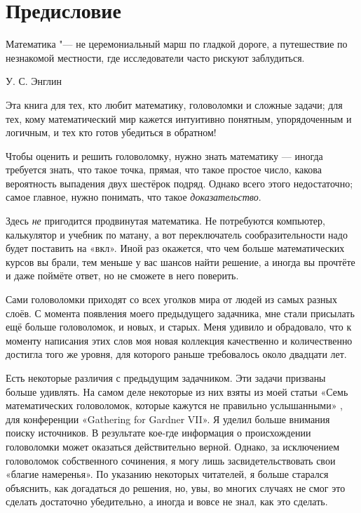 \chapter*{Предисловие}

\setlength{\epigraphwidth}{.6\textwidth}
\epigraph{Математика "--- не церемониальный марш по гладкой дороге, а путешествие по незнакомой местности, где исследователи часто рискуют заблудиться.
}{У. С. Энглин
}

Эта книга для тех, кто любит математику, головоломки и сложные задачи;
для тех, кому математический мир кажется интуитивно понятным, упорядоченным и логичным, и тех кто готов убедиться в обратном!

Чтобы оценить и решить головоломку, нужно знать математику --- 
иногда требуется знать, что такое точка, прямая, что такое простое число, какова вероятность выпадения двух шестёрок подряд.
Однако всего этого недостаточно; самое главное, нужно понимать, что такое \emph{доказательство}.

Здесь \emph{не} пригодится продвинутая математика.
Не потребуются компьютер, калькулятор и учебник по матану,
а вот переключатель сообразительности надо будет поставить на «вкл».
Иной раз окажется, что чем больше математических курсов вы брали, тем меньше у вас шансов найти решение,
а иногда вы прочтёте и даже поймёте ответ, но не сможете в него поверить.

Сами головоломки приходят со всех уголков мира от людей из самых разных слоёв.
С момента появления моего предыдущего задачника, мне стали присылать ещё больше головоломок, и новых, и старых.
Меня удивило и обрадовало, что к моменту написания этих слов моя новая коллекция качественно и количественно достигла того же уровня, для которого раньше требовалось около двадцати лет.

Есть некоторые различия с предыдущим задачником.
Эти задачи призваны больше удивлять.
На самом деле некоторые из них взяты из моей статьи «Семь математических головоломок, которые кажутся не правильно услышанными» \cite{winkler-7}, для конференции «Gathering for Gard\-ner VII».
Я уделил больше внимания поиску источников.
В результате кое-где информация о происхождении головоломки может оказаться действительно верной.
Однако, за исключением головоломок собственного сочинения, я могу лишь засвидетельствовать свои «благие намеренья».
По указанию некоторых читателей, я больше старался объяснить, как догадаться до решения,
но, увы, во многих случаях не смог это сделать достаточно убедительно, а иногда и вовсе не знал, как это сделать.

